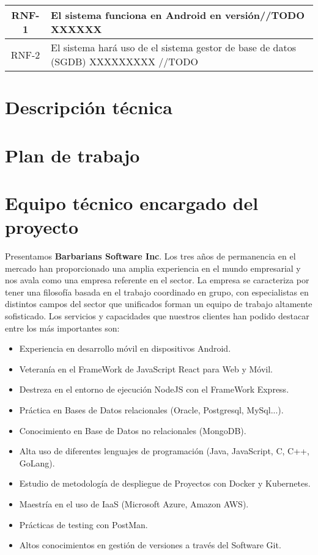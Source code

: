 \documentclass{article}
\begin{document}
\begin{table}[H]
    \centering
    \begin{tabular}{| c | p{30em} |}
        \hline
        RNF-1 & El sistema funciona en Android en versión//TODO XXXXXX  \\ \hline
        RNF-2 & El sistema hará uso de el sistema gestor de base de datos (SGDB) XXXXXXXXX //TODO \\ \hline
    \end{tabular}
\end{table}







\section{Descripción técnica}



\section{Plan de trabajo}

\section{Equipo técnico encargado del proyecto}

Presentamos \textbf{Barbarians Software Inc}. Los tres años de permanencia en el mercado han proporcionado una amplia experiencia en el mundo empresarial y nos avala como una empresa referente en el sector. La empresa se caracteriza por tener una filosofía basada en el trabajo coordinado en grupo, con especialistas en distintos campos del sector que unificados forman un equipo de trabajo altamente sofisticado.
Los servicios y capacidades que nuestros clientes han podido destacar entre los más importantes son:
\begin{itemize}
   \item Experiencia en desarrollo móvil en dispositivos Android.
   \item Veteranía en el FrameWork de JavaScript React para Web y Móvil.
   \item Destreza en el entorno de ejecución NodeJS con el FrameWork Express.
   \item Práctica en Bases de Datos relacionales (Oracle, Postgresql, MySql...).
   \item Conocimiento en Base de Datos no relacionales (MongoDB).
   \item Alta uso de diferentes lenguajes de programación (Java, JavaScript, C, C++, GoLang).
   \item Estudio de metodología de despliegue de Proyectos con Docker y Kubernetes.
   \item Maestría en el uso de IaaS (Microsoft Azure, Amazon AWS).
   \item Prácticas de testing con PostMan.
   \item Altos conocimientos en gestión de versiones a través del Software Git.
\end{itemize}
\end{document}
